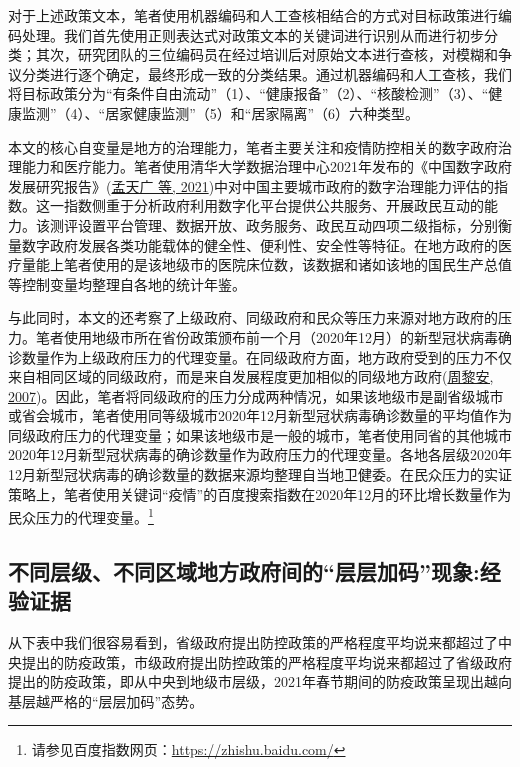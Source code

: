 \documentclass[
  12pt,
]{ctexart}
\begin{document}
对于上述政策文本，笔者使用机器编码和人工查核相结合的方式对目标政策进行编码处理。我们首先使用正则表达式对政策文本的关键词进行识别从而进行初步分类；其次，研究团队的三位编码员在经过培训后对原始文本进行查核，对模糊和争议分类进行逐个确定，最终形成一致的分类结果。通过机器编码和人工查核，我们将目标政策分为``有条件自由流动''（1）、``健康报备''（2）、``核酸检测''（3）、``健康监测''（4）、``居家健康监测''（5）和``居家隔离''（6）六种类型。

本文的核心自变量是地方的治理能力，笔者主要关注和疫情防控相关的数字政府治理能力和医疗能力。笔者使用清华大学数据治理中心2021年发布的《中国数字政府发展研究报告》(\protect\hyperlink{ref-MengTianGuangZhangXiaoJing2021}{孟天广 等, 2021})中对中国主要城市政府的数字治理能力评估的指数。这一指数侧重于分析政府利用数字化平台提供公共服务、开展政民互动的能力。该测评设置平台管理、数据开放、政务服务、政民互动四项二级指标，分别衡量数字政府发展各类功能载体的健全性、便利性、安全性等特征。在地方政府的医疗量能上笔者使用的是该地级市的医院床位数，该数据和诸如该地的国民生产总值等控制变量均整理自各地的统计年鉴。

与此同时，本文的还考察了上级政府、同级政府和民众等压力来源对地方政府的压力。笔者使用地级市所在省份政策颁布前一个月（2020年12月）的新型冠状病毒确诊数量作为上级政府压力的代理变量。在同级政府方面，地方政府受到的压力不仅来自相同区域的同级政府，而是来自发展程度更加相似的同级地方政府(\protect\hyperlink{ref-ZhouLiAn2007}{周黎安, 2007})。因此，笔者将同级政府的压力分成两种情况，如果该地级市是副省级城市或省会城市，笔者使用同等级城市2020年12月新型冠状病毒确诊数量的平均值作为同级政府压力的代理变量；如果该地级市是一般的城市，笔者使用同省的其他城市2020年12月新型冠状病毒的确诊数量作为政府压力的代理变量。各地各层级2020年12月新型冠状病毒的确诊数量的数据来源均整理自当地卫健委。在民众压力的实证策略上，笔者使用关键词``疫情''的百度搜索指数在2020年12月的环比增长数量作为民众压力的代理变量。\footnote{请参见百度指数网页：\url{https://zhishu.baidu.com/}}

\hypertarget{ux4e0dux540cux5c42ux7ea7ux4e0dux540cux533aux57dfux5730ux65b9ux653fux5e9cux95f4ux7684ux5c42ux5c42ux52a0ux7801ux73b0ux8c61ux7ecfux9a8cux8bc1ux636e}{%
\subsection{不同层级、不同区域地方政府间的``层层加码''现象:经验证据}\label{ux4e0dux540cux5c42ux7ea7ux4e0dux540cux533aux57dfux5730ux65b9ux653fux5e9cux95f4ux7684ux5c42ux5c42ux52a0ux7801ux73b0ux8c61ux7ecfux9a8cux8bc1ux636e}}

从下表中我们很容易看到，省级政府提出防控政策的严格程度平均说来都超过了中央提出的防疫政策，市级政府提出防控政策的严格程度平均说来都超过了省级政府提出的防疫政策，即从中央到地级市层级，2021年春节期间的防疫政策呈现出越向基层越严格的``层层加码''态势。
\end{document}
